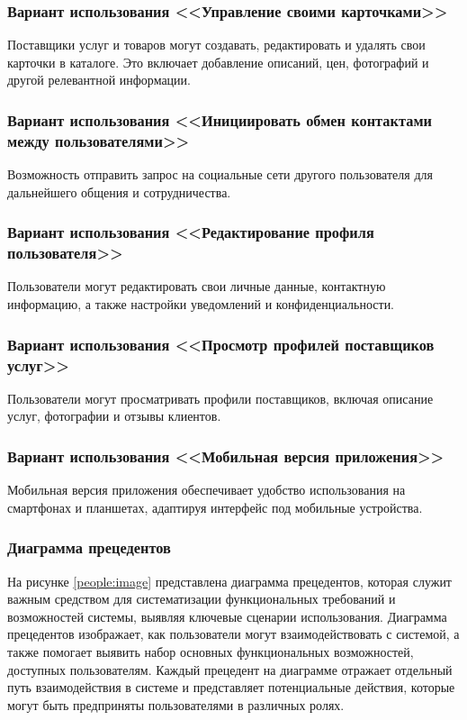 \subsubsection{Вариант использования <<Управление своими карточками>>}
Поставщики услуг и товаров могут создавать, редактировать и удалять свои карточки в каталоге. Это включает добавление описаний, цен, фотографий и другой релевантной информации.

\subsubsection{Вариант использования <<Инициировать обмен контактами между пользователями>>} 
Возможность отправить запрос на социальные сети другого пользователя для дальнейшего общения и сотрудничества.

\subsubsection{Вариант использования <<Редактирование профиля пользователя>>}
Пользователи могут редактировать свои личные данные, контактную информацию, а также настройки уведомлений и конфиденциальности.

\subsubsection{Вариант использования <<Просмотр профилей поставщиков услуг>>}
Пользователи могут просматривать профили поставщиков, включая описание услуг, фотографии и отзывы клиентов.

\subsubsection{Вариант использования <<Мобильная версия приложения>>}
Мобильная версия приложения обеспечивает удобство использования на смартфонах и планшетах, адаптируя интерфейс под мобильные устройства.

\subsubsection{Диаграмма прецедентов}
На рисунке \ref{people:image} представлена диаграмма прецедентов, которая служит важным средством для систематизации функциональных требований и возможностей системы, выявляя ключевые сценарии использования. Диаграмма прецедентов изображает, как пользователи могут взаимодействовать с системой, а также помогает выявить набор основных функциональных возможностей, доступных пользователям. Каждый прецедент на диаграмме отражает отдельный путь взаимодействия в системе и представляет потенциальные действия, которые могут быть предприняты пользователями в различных ролях.

